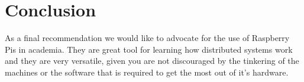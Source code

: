 \documentclass[10pt,a4wide]{article}
\begin{document}
\newpage
\section{Conclusion}


As a final recommendation we would like to advocate for the use of Raspberry Pis in academia. They are great tool for learning how distributed systems work and they are very versatile, given you are not discouraged by the tinkering of the machines or the software that is required to get the most out of it's hardware.


\newpage
{}


\nocite{*}
\end{document}
